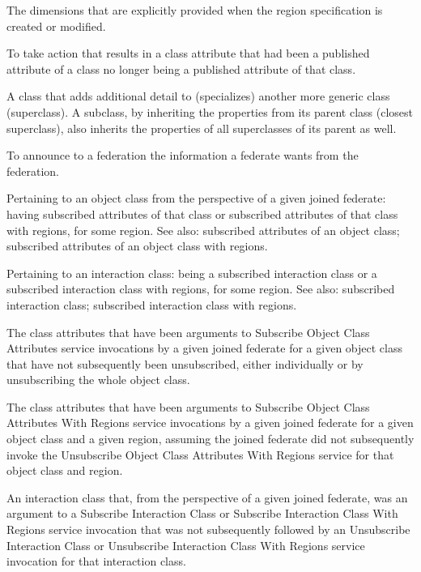  The dimensions that are explicitly provided when the region specification is created or modified.

 To take action that results in a class attribute that had been a published attribute of a class no longer being a published attribute of that class.

 A class that adds additional detail to (specializes) another more generic class (superclass). A subclass, by inheriting the properties from its parent class (closest superclass), also inherits the properties of all superclasses of its parent as well.

 To announce to a federation the information a federate wants from the federation.

\begin{stdalphalist}
    \item Pertaining to an object class from the perspective of a given joined federate: having subscribed attributes of that class or subscribed attributes of that class with regions, for some region. See also: subscribed attributes of an object class; subscribed attributes of an object class with regions.
    \item Pertaining to an interaction class: being a subscribed interaction class or a subscribed interaction class with regions, for some region. See also: subscribed interaction class; subscribed interaction class with regions.
\end{stdalphalist}

 The class attributes that have been arguments to Subscribe Object Class Attributes service invocations by a given joined federate for a given object class that have not subsequently been unsubscribed, either individually or by unsubscribing the whole object class.

 The class attributes that have been arguments to Subscribe Object Class Attributes With Regions service invocations by a given joined federate for a given object class and a given region, assuming the joined federate did not subsequently invoke the Unsubscribe Object Class Attributes With Regions service for that object class and region.

\clearpage
{} An interaction class that, from the perspective of a given joined federate, was an argument to a Subscribe Interaction Class or Subscribe Interaction Class With Regions service invocation that was not subsequently followed by an Unsubscribe Interaction Class or Unsubscribe Interaction Class With Regions service invocation for that interaction class.

